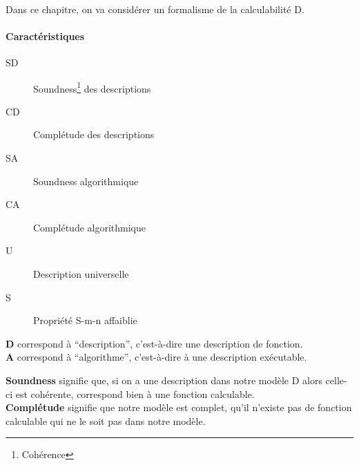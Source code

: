 \paragraph{} Dans ce chapitre, on va considérer un formalisme de la calculabilité D.

\begin{samepage}
\paragraph{Caractéristiques}
\begin{description}
	\item[SD] Soundness\footnote{Cohérence} des descriptions
	\item[CD] Complétude des descriptions
	\item[SA] Soundness algorithmique
	\item[CA] Complétude algorithmique
	\item[U] Description universelle\nopagebreak
	\item[S] Propriété S-m-n affaiblie
\end{description}
\end{samepage}

\begin{myrem}
	\textbf{D} correspond à ``description'', c'est-à-dire une description de fonction.\\
	\textbf{A} correspond à ``algorithme'', c'est-à-dire à une description exécutable.
\end{myrem}

\begin{myrem}
	\textbf{Soundness} signifie que, si on a une description dans notre modèle D alors celle-ci est cohérente, correspond bien à une fonction calculable.\\
	\textbf{Complétude} signifie que notre modèle est complet, qu'il n'existe pas de fonction calculable qui ne le soit pas dans notre modèle.
\end{myrem}


